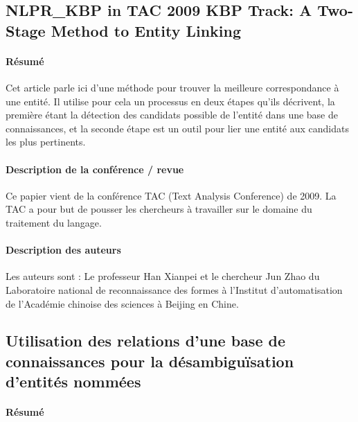 \documentclass{article}
\begin{document}
\subsection{NLPR\_KBP in TAC 2009 KBP Track: A Two-Stage Method to Entity Linking\cite{article-10}}

\paragraph{Résumé}

Cet article parle ici d’une méthode pour trouver la meilleure correspondance à une entité. Il utilise pour cela un processus en deux étapes qu’ils décrivent, la première étant la détection des candidats possible de l’entité dans une base de connaissances, et la seconde étape est un outil pour lier une entité aux candidats les plus pertinents.


\paragraph{Description de la conférence / revue}

Ce papier vient de la conférence TAC (Text Analysis Conference) de 2009. La TAC a pour but de pousser les chercheurs à travailler sur le domaine du traitement du langage.


\paragraph{Description des auteurs}

Les auteurs sont : Le professeur Han Xianpei et le chercheur Jun Zhao du Laboratoire national de reconnaissance des formes à l'Institut d'automatisation de l'Académie chinoise des sciences à Beijing en Chine.


\subsection{Utilisation des relations d’une base de connaissances pour la désambiguïsation d’entités nommées\cite{article-11}}

\paragraph{Résumé}
\end{document}

